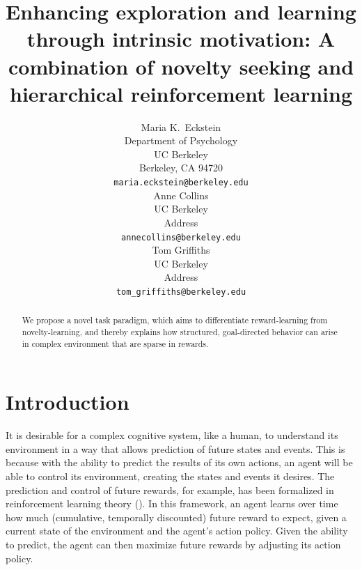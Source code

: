 \documentclass{article}
\title{Enhancing exploration and learning through intrinsic motivation: A combination of novelty seeking and hierarchical reinforcement learning}
\author{
  Maria K.~Eckstein \\
  Department of Psychology \\
  UC Berkeley \\
  Berkeley, CA 94720 \\
  \texttt{maria.eckstein@berkeley.edu} \\  
  \And
  Anne Collins \\
  UC Berkeley \\
  Address \\
  \texttt{annecollins@berkeley.edu} \\
  \And
  Tom Griffiths \\
  UC Berkeley \\
  Address \\
  \texttt{tom_griffiths@berkeley.edu} \\
}
\begin{document}
\maketitle

\begin{abstract}
  We propose a novel task paradigm, which aims to differentiate reward-learning from novelty-learning, and thereby explains how structured, goal-directed behavior can arise in complex environment that are sparse in rewards. 
\end{abstract}

\section{Introduction}

It is desirable for a complex cognitive system, like a human, to understand its environment in a way that allows prediction of future states and events. This is because with the ability to predict the results of its own actions, an agent will be able to control its environment, creating the states and events it desires. The prediction and control of future rewards, for example, has been formalized in reinforcement learning theory (\cite{sutton_reinforcement_2017}). In this framework, an agent learns over time how much (cumulative, temporally discounted) future reward to expect, given a current state of the environment and the agent's action policy. Given the ability to predict, the agent can then maximize future rewards by adjusting its action policy.
\end{document}
